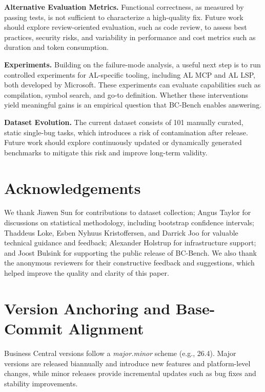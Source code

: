 \documentclass{article}
\begin{document}
\textbf{Alternative Evaluation Metrics.} Functional correctness, as measured by passing tests, is not sufficient to characterize a high-quality fix. Future work should explore review-oriented evaluation, such as code review, to assess best practices, security risks, and variability in performance and cost metrics such as duration and token consumption.

\textbf{Experiments.} Building on the failure-mode analysis, a useful next step is to run controlled experiments for AL-specific tooling, including AL MCP and AL LSP, both developed by Microsoft. These experiments can evaluate capabilities such as compilation, symbol search, and go-to definition. Whether these interventions yield meaningful gains is an empirical question that BC-Bench enables answering.

\label{sec:dataset-evolution}\textbf{Dataset Evolution.} The current dataset consists of 101 manually curated, static single-bug tasks, which introduces a risk of contamination after release. Future work should explore continuously updated or dynamically generated benchmarks to mitigate this risk and improve long-term validity.

\section{Acknowledgements}
We thank Jiawen Sun for contributions to dataset collection; Angus Taylor for discussions on statistical methodology, including bootstrap confidence intervals; Thaddeus Loke, Esben Nyhuus Kristoffersen, and Darrick Joo for valuable technical guidance and feedback; Alexander Holstrup for infrastructure support; and Joost Bulsink for supporting the public release of BC-Bench. We also thank the anonymous reviewers for their constructive feedback and suggestions, which helped improve the quality and clarity of this paper.

\clearpage




\clearpage

\appendix
\section{Version Anchoring and Base-Commit Alignment}
\label{app:bc-release-lifecycle}

Business Central versions follow a \textit{major.minor} scheme (e.g., 26.4). Major versions are released biannually and introduce new features and platform-level changes, while minor releases provide incremental updates such as bug fixes and stability improvements.
\end{document}

